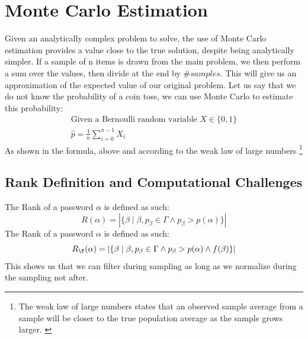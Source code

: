 \documentclass[english,noexaminfo,a4paper,oneside, binding = 0.6cm]{sapthesis}
\begin{document}
\section{Monte Carlo Estimation}
\label{sec:montecarlo}
Given an analytically complex problem to solve, the use of Monte Carlo estimation provides a value close to the true solution, despite being analytically simpler.
If a sample of n items  is drawn from the main problem, we then perform a sum over the values, then divide at the end by $\#samples$.
 This will give us an approximation of the expected value of our original problem.
Let us say that we do not know the probability of a coin toss, we can use Monte Carlo to estimate this probability:
  \begin{gather*}
  \text{Given a Bernoulli random variable } X \in \{0,1\} \\
  \hat{p}= \frac{1}{n}\sum_{i=0}^{n-1}X_i
\end{gather*}
    As shown in the formula, above and according to the weak law of large numbers \footnote{The weak law of large numbers states that an observed sample average from a sample will be closer to the true population average as the sample grows larger. \cite{ref:loeve}}

\subsection{Rank Definition and Computational Challenges}
The Rank of a password $\alpha$ is defined as such: 
\begin{equation}
  R(\alpha) = |\{\beta \mid \beta,p_\beta \in \Gamma \wedge p_\beta > p(\alpha)  \}|
  \label{eq:realrank}
\end{equation}
The Rank of a password $\alpha$ is defined as such: 
\begin{equation}
  R_\f(\alpha) = |\{\beta \mid \beta,p_\beta \in \Gamma \wedge p_\beta > p(\alpha) \wedge f(\beta) \}|
  \label{eq:realrankfiltered}
\end{equation}
This shows us that we can filter during sampling as long as we normalize during the sampling not after.
\end{document}
